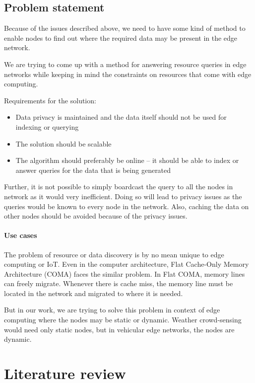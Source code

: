 \section{Problem statement}

Because of the issues described above, we need to have some kind of method to
enable nodes to find out where the required data may be present in the edge
network.

We are trying to come up with a method for answering resource queries in edge
networks while keeping in mind the constraints on resources that come with edge
computing.

Requirements for the solution:
\begin{itemize}
      \item Data privacy is maintained and the data itself should not be used
            for indexing or querying
      \item The solution should be scalable
      \item The algorithm should preferably be online -- it should be able to
            index or answer queries for the data that is being generated
\end{itemize}

Further, it is not possible to simply boardcast the query to all the nodes in
network as it would very inefficient. Doing so will lead to privacy issues as
the queries would be known to every node in the network. Also, caching the data
on other nodes should be avoided because of the privacy issues.

\subsubsection{Use cases}

The problem of resource or data discovery is by no mean unique to edge computing
or IoT. Even in the computer architecture, Flat Cache-Only Memory Architecture
(COMA) faces the similar problem. In Flat COMA, memory lines can freely migrate.
Whenever there is cache miss, the memory line must be located in the network and
migrated to where it is needed.
\cite{joseptorrellasCacheOnlyMemoryArchitecture}

But in our work, we are trying to solve this problem in context of edge
computing where the nodes may be static or dynamic. Weather crowd-sensing would
need only static nodes, but in vehicular edge networks, the nodes are dynamic.


\chapter{Literature review}

